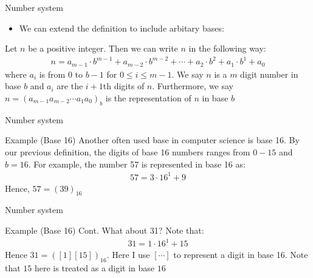 \documentclass[10pt,xcolor={table,dvipsnames},t]{beamer}
\begin{document}
\begin{frame}{Number system}
  \begin{itemize}
    \item We can extend the definition to include arbitary bases:
  \end{itemize}
  \begin{definition}
    Let $n$ be a positive integer. Then we can write $n$ in the following way:
    \begin{align*}
      n =  a_{m-1} \cdot b^{m-1} + a_{m-2} \cdot b^{m-2} + \cdots + a_{2} \cdot b^2 + a_{1} \cdot b^{1} + a_{0}
    \end{align*}
    where $a_i$ is from $0$ to $b-1$ for $0\leq i \leq m-1$. We say $n$ is a $m$ digit number in base $b$ and $a_i$ are the $i+1$th digits of $n$. Furthermore, we say $n = (a_{m-1}a_{m-2} \cdots a_{1} a_{0})_b$ is the representation of $n$ in base $b$
  \end{definition}
\end{frame}

\begin{frame}{Number system}
  \begin{exampleblock}{Example (Base 16)}
    Another often used base in computer science is base 16. By our previous definition, the digits of base 16 numbers ranges from $0-15$ and $b=16$. For example, the number 57 is represented in base 16 as:
    \begin{align*}
      57 = 3\cdot 16^1 + 9 
    \end{align*}
    Hence, $57=(39)_{16}$
  \end{exampleblock}
\end{frame}

\begin{frame}{Number system}
  \begin{exampleblock}{Example (Base 16) Cont.}
    What about 31? Note that:
    \begin{align*}
      31 = 1\cdot 16^1 + 15
    \end{align*}
    Hence $31 = ([1][15])_{16}$. Here I use $[\cdots]$ to represent a digit in base 16. Note that $15$ here is treated as a digit in base $16$
  \end{exampleblock}
\end{frame}
\end{document}
